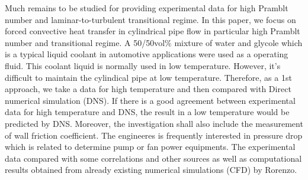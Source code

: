 \documentclass[conference]{IEEEtran}
\begin{document}
Much remains to be studied for providing experimental data for high Pramblt number and laminar-to-turbulent transitional regime.
In this paper, we focus on forced convective heat transfer in cylindrical pipe flow in particular high Pramblt number and transitional regime.
A 50/50vol\% mixture of water and glycole which is a typical liquid coolant in automotive applications were used as a operating fluid.
This coolant liquid is normally used in low temperature.
However, it's difficult to maintain the cylindical pipe at low temperature.
Therefore, as a 1st approach, we take a data for high temperature and then compared with Direct numerical simulation (DNS).
If there is a good agreement between experimental data for high temperature and DNS, the result in a low temperature would be predicted by DNS.
Moreover, the investigation shall also include the measurement of wall friction coefficient.
The engineeres is frequently interested in pressure drop which is related to determine pump or fan power equipments.
The experimental data compared with some correlations and other sources as well as computational results obtained from already existing numerical simulations (CFD) by Rorenzo\cite{Rorenzo2019}.

%
\end{document}
